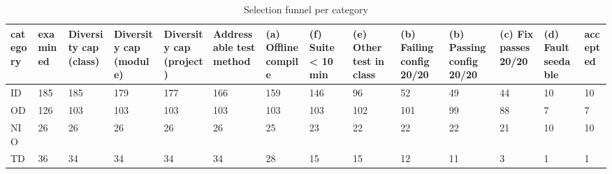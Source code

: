 \begin{table}[t]
\centering\small
\caption{Selection funnel per category}
\label{tab:selection_funnel}
\begin{tabular}{llllllllllllll}
\toprule
\textbf{category} & \textbf{examined} & \textbf{Diversity cap (class)} & \textbf{Diversity cap (module)} & \textbf{Diversity cap (project)} & \textbf{Addressable test method} & \textbf{(a) Offline compile} & \textbf{(f) Suite < 10 min} & \textbf{(e) Other test in class} & \textbf{(b) Failing config 20/20} & \textbf{(b) Passing config 20/20} & \textbf{(c) Fix passes 20/20} & \textbf{(d) Fault seedable} & \textbf{accepted} \\
\midrule
ID & 185 & 185 & 179 & 177 & 166 & 159 & 146 & 96 & 52 & 49 & 44 & 10 & 10 \\
OD & 126 & 103 & 103 & 103 & 103 & 103 & 103 & 102 & 101 & 99 & 88 & 7 & 7 \\
NIO & 26 & 26 & 26 & 26 & 26 & 25 & 23 & 22 & 22 & 22 & 21 & 10 & 10 \\
TD & 36 & 34 & 34 & 34 & 34 & 28 & 15 & 15 & 12 & 11 & 3 & 1 & 1 \\
\bottomrule
\end{tabular}
\end{table}
